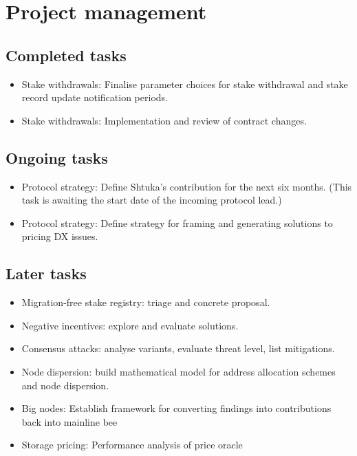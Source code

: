 \section*{Project management}

\subsection*{Completed tasks}

\begin{itemize}
  \item Stake withdrawals: Finalise parameter choices for stake withdrawal and stake record update notification periods.
  \item Stake withdrawals: Implementation and review of contract changes.
\end{itemize}

\subsection*{Ongoing tasks}

\begin{itemize}
  \item Protocol strategy: Define Shtuka's contribution for the next six months. (This task is awaiting the start date of the incoming protocol lead.)
  \item Protocol strategy: Define strategy for framing and generating solutions to pricing DX issues.
\end{itemize}

\subsection*{Later tasks}
\begin{itemize}
  \item Migration-free stake registry: triage and concrete proposal.
  \item Negative incentives: explore and evaluate solutions.
  \item Consensus attacks: analyse variants, evaluate threat level, list mitigations.
  \item Node dispersion: build mathematical model for address allocation schemes and node dispersion.
  \item Big nodes: Establish framework for converting findings into contributions back into mainline bee
  \item Storage pricing: Performance analysis of price oracle
\end{itemize}



